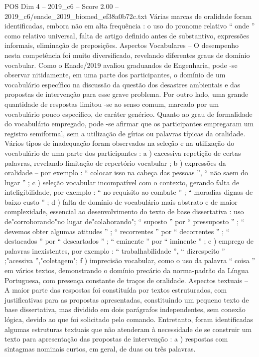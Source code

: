 \begin{textsample}{POS Dim 4 – 2019\_c6 – Score 2.00 – 2019\_c6/enade\_2019\_biomed\_ef38a0b72c.txt}
Várias marcas de oralidade foram identificadas, embora não em alta frequência : o uso do pronome relativo “ onde ” como relativo universal, falta de artigo definido antes de substantivo, expressões informais, eliminação de preposições.
Aspectos Vocabulares – O desempenho nesta competência foi muito diversificado, revelando diferentes graus de domínio vocabular.
Como o Enade/2019 avaliou graduandos de Engenharia, pode -se observar nitidamente, em uma parte dos participantes, o domínio de um vocabulário específico na discussão da questão dos desastres ambientais e das propostas de intervenção para esse grave problema.
Por outro lado, uma grande quantidade de respostas limitou -se ao senso comum, marcado por um vocabulário pouco específico, de caráter genérico.
Quanto ao grau de formalidade do vocabulário empregado, pode -se afirmar que os participantes empregaram um registro semiformal, sem a utilização de gírias ou palavras típicas da oralidade.
Vários tipos de inadequação foram observados na seleção e na utilização do vocabulário de uma parte dos participantes : a ) excessiva repetição de certas palavras, revelando limitação de repertório vocabular ; b ) expressões da oralidade – por exemplo : “ colocar isso na cabeça das pessoas ”, “ não saem do lugar ” ; c ) seleção vocabular incompatível com o contexto, gerando falta de inteligibilidade, por exemplo : “ no requisito ao combate ” ; “ moradias dignas de baixo custo ” ; d ) falta de domínio de vocabulário mais abstrato e de maior complexidade, essencial ao desenvolvimento do texto de base dissertativa : uso de"corroborando"no lugar de"colaborando"; “ suposto ” por “ pressuposto ” ; “ devemos obter algumas atitudes ” ; “ recorrentes ” por “ decorrentes ” ; “ destacados ” por “ descartados ” ; “ eminente ” por “ iminente ” ; e ) emprego de palavras inexistentes, por exemplo : “ trabalhabilidade ”, “ dizrespeito ” ;"acessiva ”,"coletagem"; f ) imprecisão vocabular, como o uso da palavra “ coisa ” em vários textos, demonstrando o domínio precário da norma-padrão da Língua Portuguesa, com presença constante de traços de oralidade.
Aspectos textuais – A maior parte das respostas foi constituída por textos estruturados, com justificativas para as propostas apresentadas, constituindo um pequeno texto de base dissertativa, mas dividido em dois parágrafos independentes, sem conexão lógica, devido ao que foi solicitado pelo comando.
Entretanto, foram identificadas algumas estruturas textuais que não atenderam à necessidade de se construir um texto para apresentação das propostas de intervenção : a ) respostas com sintagmas nominais curtos, em geral, de duas ou três palavras.

\end{textsample}
